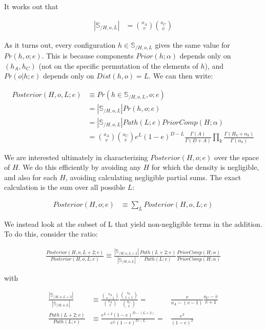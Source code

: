 \documentclass{article}
\begin{document}
It works out that

\begin{align}
  |\mathbb{S}_{/H,o,L}| & = {o_A \choose v} {o_C \choose \bar{v}}
\end{align}

As it turns out, every configuration $h \in \mathbb{S}_{/H,o,L}$ gives the same
value for $Pr(h, o; e)$.  This is because components $Prior(h;\alpha)$
depends only on $(h_A,h_C)$ (not on the specific permutation of the
elements of $h$), and $Pr(o|h;e)$ depends only on $Dist(h,o) = L$. We
can then write:

\begin{align}
  Posterior(H,o,L;e) & \equiv Pr(h \in \mathbb{S}_{/H,o,L},o;e) \nonumber \\[2ex]
  & = |\mathbb{S}_{/H,o,L}| Pr(h,o;e) \nonumber \\[2ex]
  & = |\mathbb{S}_{/H,o,L}| Path(L;e) PriorComp(H;\alpha) \nonumber \\[2ex]
  & = {o_A \choose v}{o_C \choose \bar{v}}
  e^L(1-e)^{D-L}
  \frac{\Gamma(A)}{\Gamma(D+A)}
  \prod_k \frac{\Gamma(H_k+\alpha_k)}{\Gamma(\alpha_k)}
\end{align}


We are interested ultimately in characterizing $Posterior(H,o;e)$ over
the space of $H$.  We do this efficiently by avoiding any $H$ for
which the density is negligible, and also for each $H$, avoiding
calculating negligible partial sums. The exact calculation is the sum
over all possible $L$:

\begin{align}
  Posterior(H,o;e) & \equiv \sum_L Posterior(H,o,L;e) \nonumber
\end{align}

We instead look at the subset of L that yield non-negligible terms in
the addition. To do this, consider the ratio:

\begin{align}
  \frac{Posterior(H,o,L+2;e)}{Posterior(H,o,L;e)} \equiv
  \frac{|\mathbb{S}_{/H,o,L+2}|}{|\mathbb{S}_{/H,o,L}|}
  \frac{Path(L+2;e)}{Path(L;e)}
  \frac{PriorComp(H;\alpha)}{PriorComp(H;\alpha)}
\end{align}

with

\begin{align}
  \frac{|\mathbb{S}_{/H,o,L+2}|}{|\mathbb{S}_{/H,o,L}|}
  & \equiv
  \frac{{o_A \choose {v-1}}}{{o_A \choose v}}
  \frac{{o_C \choose {\bar{v}+1}}}{{o_C \choose {\bar{v}}}}
  = &
  \frac{v}{o_A-(v-1)}
  \frac{o_C - \bar{v}}{\bar{v} + 1} \\[4ex]
  \frac{Path(L+2;e)}{Path(L;e)}
  & \equiv
  \frac{e^{L+2}(1-e)^{D-(L+2)}}{e^L(1-e)^{D-L}}
  = &
  \frac{e^2}{(1-e)^2}
\end{align}
\end{document}
